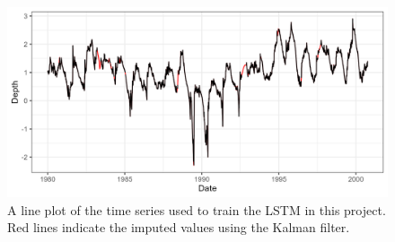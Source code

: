 \begin{figure}[ht]
    \centering
    \includegraphics[width=0.9\linewidth]{"Figures/Interpolation_60_20.png"}
    \caption{A line plot of the time series used to train the LSTM in this project. Red lines indicate the imputed values using the Kalman filter.}
    \label{fig:P33_Interpolated}
\end{figure}

\FloatBarrier